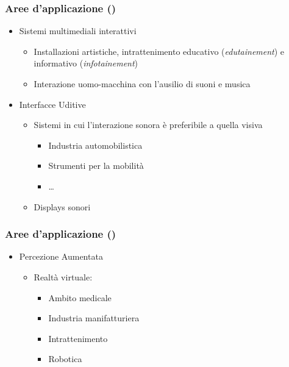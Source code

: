 \begin{frame}
    \frametitle{Aree d'applicazione ()}

    \begin{itemize}
        \item{Sistemi multimediali interattivi}
            \begin{itemize}
                \item{Installazioni artistiche, intrattenimento educativo
                    (\emph{edutainement}) e informativo (\emph{infotainement})}
                \item{Interazione uomo-macchina con l'ausilio di suoni e
                    musica}
            \end{itemize}
        \item{Interfacce Uditive}
            \begin{itemize}
                \item{Sistemi in cui l'interazione sonora \`e preferibile a
                    quella visiva}
                    \begin{itemize}
                        \item{Industria automobilistica}
                        \item{Strumenti per la mobilit\`a}
                        \item{\dots}
                    \end{itemize}
                \item{Displays sonori}
            \end{itemize}
    \end{itemize}
    
\end{frame}

\begin{frame}
    \frametitle{Aree d'applicazione ()}

    \begin{itemize}
        \item{Percezione Aumentata}
            \begin{itemize}
                \item{Realt\`a virtuale:}
                    \begin{itemize}
                        \item{Ambito medicale}
                        \item{Industria manifatturiera}
                        \item{Intrattenimento}
                        \item{Robotica}
                    \end{itemize}
            \end{itemize}
    \end{itemize}
    
\end{frame}
